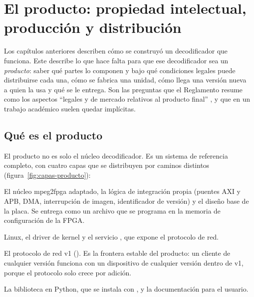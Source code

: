 \chapter[El producto]{El producto: propiedad intelectual, producción y distribución}
\label{cap:producto}

Los capítulos anteriores describen cómo se construyó un decodificador que
funciona. Este describe lo que hace falta para que ese decodificador sea un
\emph{producto}: saber qué partes lo componen y bajo qué condiciones legales
puede distribuirse cada una, cómo se fabrica una unidad, cómo llega una
versión nueva a quien la usa y qué se le entrega. Son las preguntas que el
Reglamento resume como los aspectos \enquote{legales y de mercado relativos al
producto final} \citep[punto 1.2]{UTN_FRLR_2023_reglamento}, y que en un
trabajo académico suelen quedar implícitas.

\section{Qué es el producto}

El producto no es solo el núcleo decodificador. Es un sistema de referencia
completo, con cuatro capas que se distribuyen por caminos distintos
(figura~\ref{fig:capas-producto}):

\begin{description}[style=nextline, leftmargin=1.5em]
  \item[Bitstream de la FPGA] El núcleo mpeg2fpga adaptado, la lógica de
    integración propia (puentes AXI y APB, DMA, interrupción de imagen,
    identificador de versión) y el diseño base de la placa. Se entrega como un
    archivo  que se programa en la memoria de configuración de la
    FPGA.
  \item[Software de la placa] Linux, el driver de kernel 
    y el servicio , que expone el protocolo de red.
  \item[Contrato de interfaz] El protocolo de red v1 ().
    Es la frontera estable del producto: un cliente de cualquier versión
    funciona con un dispositivo de cualquier versión dentro de v1, porque el
    protocolo solo crece por adición.
  \item[Software del cliente] La biblioteca en Python, que se instala con
    , y la documentación para el usuario.
\end{description}

